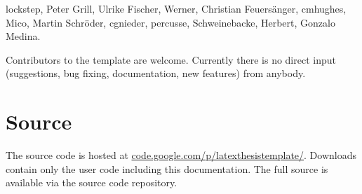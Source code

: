 lockstep, %
Peter Grill, %
Ulrike Fischer, %
Werner, %
Christian Feuersänger, %
cmhughes, %
Mico, %
Martin Schröder, %
cgnieder, %
percusse, %
Schweinebacke, %
Herbert, %
Gonzalo Medina.%
%

Contributors to the template are welcome. Currently there is no direct input (suggestions, bug fixing, documentation, new features) from anybody.

\section*{Source}
The source code is hosted at \url{code.google.com/p/latexthesistemplate/}. Downloads contain only the user code including this documentation. The full source is available via the source code repository.

